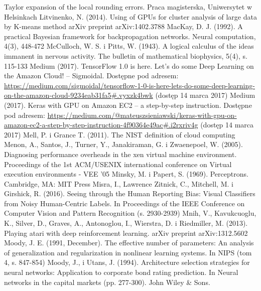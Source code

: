 \documentclass[12pt,a4paper,twoside]{article}
\begin{document}
\begin{thebibliography}{99}
Taylor expansion of the local rounding errors. Praca magisterska, Uniwersytet w Helsinkach
 Litvinenko, N. (2014). Using of GPUs for cluster analysis of large data by K-means method arXiv preprint arXiv:1402.3788
 MacKay, D. J. (1992). A practical Bayesian framework for backpropagation networks. Neural computation, 4(3), 448-472
 McCulloch, W. S. i Pitts, W. (1943). A logical calculus of the ideas immanent in nervous activity. The bulletin of mathematical biophysics, 5(4), s. 115-133
 Medium (2017). TensorFlow 1.0 is here. Let’s do some Deep Learning on the Amazon Cloud! – Sigmoidal. Dostępne pod adresem: \url{https://medium.com/sigmoidal/tensorflow-1-0-is-here-lets-do-some-deep-learning-on-the-amazon-cloud-9234eab31fa5#.vyxzk4bwk} (dostęp 14 marca 2017)
 Medium (2017). Keras with GPU on Amazon EC2 – a step-by-step instruction. Dostępne pod adresem: \url{https://medium.com/@mateuszsieniawski/keras-with-gpu-on-amazon-ec2-a-step-by-step-instruction-4f90364e49ac#.i2rxriv4g} (dostęp 14 marca 2017)
 Mell, P. i Grance T. (2011). The NIST definition of cloud computing
 Menon, A., Santos, J., Turner, Y., Janakiraman, G. i Zwaenepoel, W. (2005). Diagnosing performance overheads in the xen virtual machine environment. Proceedings of the 1st ACM/USENIX international conference on Virtual execution environments - VEE '05
 Minsky, M. i Papert, S. (1969). Perceptrons. Cambridge, MA: MIT Press
 Misra, I., Lawrence Zitnick, C., Mitchell, M. i Girshick, R. (2016). Seeing through the Human Reporting Bias: Visual Classifiers from Noisy Human-Centric Labels. In Proceedings of the IEEE Conference on Computer Vision and Pattern Recognition (s. 2930-2939)
 Mnih, V., Kavukcuoglu, K., Silver, D., Graves, A., Antonoglou, I., Wierstra, D. i Riedmiller, M. (2013). Playing atari with deep reinforcement learning. arXiv preprint arXiv:1312.5602
 Moody, J. E. (1991, December). The effective number of parameters: An analysis of generalization and regularization in nonlinear learning systems. In NIPS (tom 4, s. 847-854)
 Moody, J., i Utans, J. (1994). Architecture selection strategies for neural networks: Application to corporate bond rating prediction. In Neural networks in the capital markets (pp. 277-300). John Wiley \& Sons.

\end{thebibliography}
\end{document}
